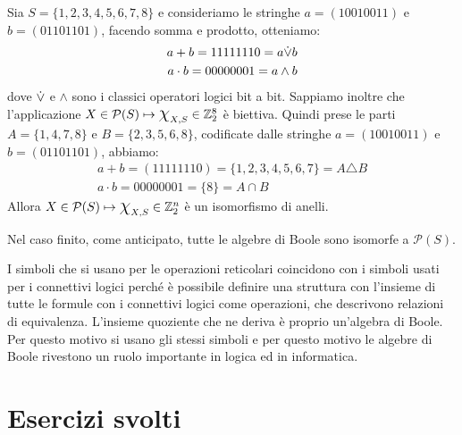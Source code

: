 \begin{example}
	Sia $S=\{1,2,3,4,5,6,7,8\}$ e consideriamo le stringhe $a=(10010011)$ e $b=(01101101)$, facendo somma e prodotto, otteniamo:
	\begin{align*}
		a+b = 1111 1110 = a {\displaystyle{\dot{\vee}}} b\\
		a \cdot b = 0000 0001 = a \wedge b
	\end{align*}
dove ${\displaystyle{\dot{\vee}}}$ e $\wedge$ sono i classici operatori logici bit a bit. Sappiamo inoltre che l'applicazione $X \in \mathcal{P}(S) \mapsto \mbox{\Large$\chi$}_{X,S} \in \mathbb{Z}_{2}^{8}$ è biettiva. Quindi prese le parti $A=\{1,4,7,8\}$ e $B=\{2,3,5,6,8\}$, codificate dalle stringhe $a=(10010011)$ e $b=(01101101)$, abbiamo:
\begin{align*}
	a+b =(11111110) = \{1,2,3,4,5,6,7\} = A \triangle B\\
	a \cdot b = 00000001 = \{8\} = A \cap B
\end{align*}
Allora $X\in \mathcal{P}(S) \mapsto \mbox{\Large$\chi$}_{X,S} \in \mathbb{Z}_{2}^{n}$ è un isomorfismo di anelli.
\end{example}

Nel caso finito, come anticipato, tutte le algebre di Boole sono isomorfe a $\mathcal{P}(S)$.

\begin{osservation}
	I simboli che si usano per le operazioni reticolari coincidono con i simboli usati per i connettivi logici perché è possibile definire una struttura con l'insieme di tutte le formule con i connettivi logici come operazioni, che descrivono relazioni di equivalenza. L'insieme quoziente che ne deriva è proprio un'algebra di Boole. Per questo motivo si usano gli stessi simboli e per questo motivo le algebre di Boole rivestono un ruolo importante in logica ed in informatica.
\end{osservation}
\newpage
\section{Esercizi svolti}
